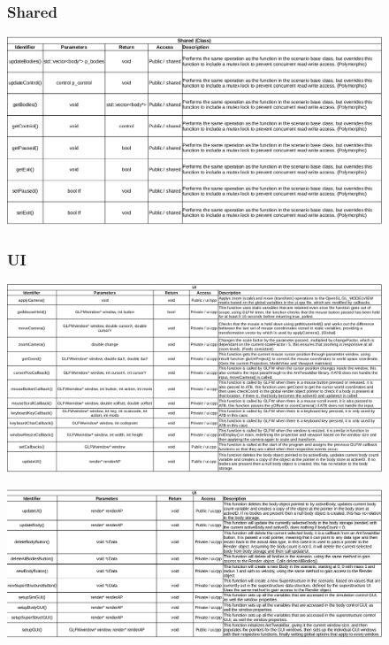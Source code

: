 \begin{figure}
  \subsubsection{Shared}
  \centering  
  \includegraphics[width=\textwidth]{img/functions/shared.png}
\end{figure}

\begin{figure}
  \subsubsection{UI}
  \centering  
  \includegraphics[width=\textwidth]{img/functions/ui.png}
\end{figure}

\begin{figure}
  \centering  
  \includegraphics[width=\textwidth]{img/functions/ui2.png}
\end{figure}

